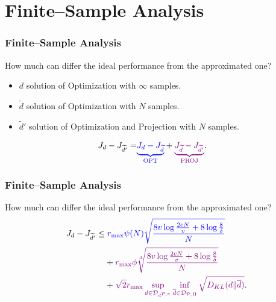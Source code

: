 \documentclass[english,aspectratio=1610]{beamer}
\theoremstyle{mystyle}
\theoremstyle{mystyle}
\theoremstyle{mystyle}
\begin{document}
\section{Finite--Sample Analysis}
\begin{frame}
	\frametitle{Finite--Sample Analysis}
	How much can differ the ideal performance from the approximated one?
	\begin{itemize}
		\item $d$ solution of Optimization with $\infty$ samples.
		\item $\widetilde{d}$ solution of Optimization with $N$ samples.
		\item $\widetilde{d}'$ solution of Optimization and Projection with $N$ samples.
	\end{itemize}
	\begin{align}
	J_d - J_{\widetilde{d}'} =& \textcolor{blue}{\underbrace{J_d - J_{\widetilde{d}}}_{\text{OPT}}} + \textcolor{violet}{\underbrace{J_{\widetilde{d}}- J_{\widetilde{d}'}}_{\mathrm{PROJ}}}.
	\end{align}
\end{frame}
\begin{frame}
	\frametitle{Finite--Sample Analysis}
	How much can differ the ideal performance from the approximated one?
	\begin{align}
	J_d - J_{\widetilde{d}'} \leq & \; \textcolor{blue}{r_{\max} \psi(N) \sqrt{\frac{8v \log\frac{2eN}{v} + 8 \log \frac{8}{\delta}}{N}}} \\
	& + \textcolor{violet}{r_{\max} \phi \sqrt[4]{\frac{8v \log\frac{2eN}{v} + 8 \log \frac{8}{\delta}}{N}}} \\
		& + \textcolor{violet}{\sqrt{2} r_{\max} \sup_{d \in \mathcal{D}_{d^{P,\pi}}}  \inf_{\overline{d} \in \mathcal{D}_{\mathcal{P},\Pi}} \sqrt{D_{KL}( d \| \overline{d})}}.
	\end{align}
\end{frame}
\end{document}
